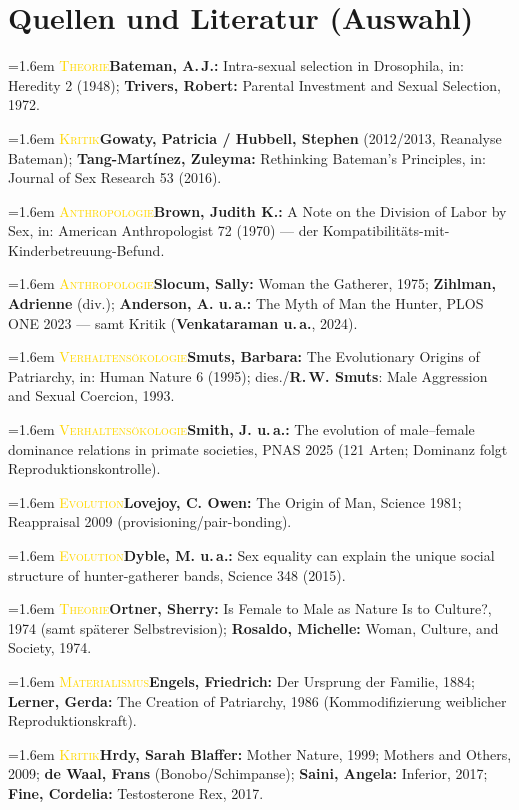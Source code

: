 \documentclass[11pt,a4paper,ngerman]{scrartcl}
\newcommand{\litentry}[2]{\par\noindent\hangindent=1.6em\hangafter=1
  {\footnotesize\scshape\textcolor{gold}{#1}}\quad #2\par\smallskip}
\begin{document}
\section{Quellen und Literatur (Auswahl)}
\litentry{Theorie}{\textbf{Bateman, A.\,J.:} Intra-sexual selection in Drosophila, in: Heredity 2 (1948); \textbf{Trivers, Robert:} Parental Investment and Sexual Selection, 1972.}
\litentry{Kritik}{\textbf{Gowaty, Patricia / Hubbell, Stephen} (2012/2013, Reanalyse Bateman); \textbf{Tang-Martínez, Zuleyma:} Rethinking Bateman's Principles, in: Journal of Sex Research 53 (2016).}
\litentry{Anthropologie}{\textbf{Brown, Judith K.:} A Note on the Division of Labor by Sex, in: American Anthropologist 72 (1970) --- der Kompatibilitäts-mit-Kinderbetreuung-Befund.}
\litentry{Anthropologie}{\textbf{Slocum, Sally:} Woman the Gatherer, 1975; \textbf{Zihlman, Adrienne} (div.); \textbf{Anderson, A. u.\,a.:} The Myth of Man the Hunter, PLOS ONE 2023 --- samt Kritik (\textbf{Venkataraman u.\,a.}, 2024).}
\litentry{Verhaltensökologie}{\textbf{Smuts, Barbara:} The Evolutionary Origins of Patriarchy, in: Human Nature 6 (1995); dies./\textbf{R.\,W. Smuts}: Male Aggression and Sexual Coercion, 1993.}
\litentry{Verhaltensökologie}{\textbf{Smith, J. u.\,a.:} The evolution of male--female dominance relations in primate societies, PNAS 2025 (121 Arten; Dominanz folgt Reproduktionskontrolle).}
\litentry{Evolution}{\textbf{Lovejoy, C. Owen:} The Origin of Man, Science 1981; Reappraisal 2009 (provisioning/pair-bonding).}
\litentry{Evolution}{\textbf{Dyble, M. u.\,a.:} Sex equality can explain the unique social structure of hunter-gatherer bands, Science 348 (2015).}
\litentry{Theorie}{\textbf{Ortner, Sherry:} Is Female to Male as Nature Is to Culture?, 1974 (samt späterer Selbstrevision); \textbf{Rosaldo, Michelle:} Woman, Culture, and Society, 1974.}
\litentry{Materialismus}{\textbf{Engels, Friedrich:} Der Ursprung der Familie, 1884; \textbf{Lerner, Gerda:} The Creation of Patriarchy, 1986 (Kommodifizierung weiblicher Reproduktionskraft).}
\litentry{Kritik}{\textbf{Hrdy, Sarah Blaffer:} Mother Nature, 1999; Mothers and Others, 2009; \textbf{de Waal, Frans} (Bonobo/Schimpanse); \textbf{Saini, Angela:} Inferior, 2017; \textbf{Fine, Cordelia:} Testosterone Rex, 2017.}

\medskip
{}
\end{document}

